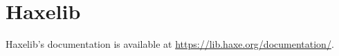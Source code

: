 \chapter{Haxelib}
\label{haxelib}

Haxelib's documentation is available at \href{https://lib.haxe.org/documentation/}{https://lib.haxe.org/documentation/}.
